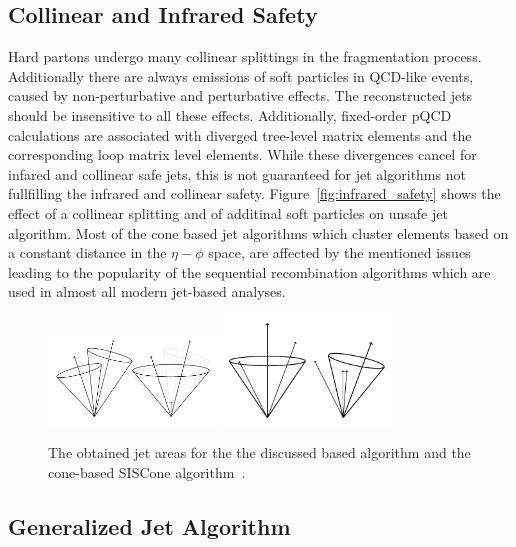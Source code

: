 \subsection{Collinear and Infrared Safety}
\label{section:coll_safety}

Hard partons undergo many collinear splittings in the fragmentation process.
Additionally there are always emissions of soft particles in QCD-like events,
caused by non-perturbative and perturbative effects. The reconstructed jets
should be insensitive to all these effects. Additionally, fixed-order pQCD
calculations are associated with diverged tree-level matrix elements and the
corresponding loop matrix level elements. While these divergences cancel for
infared and collinear safe jets, this is not guaranteed for jet algorithms not
fullfilling the infrared and collinear safety. Figure~\ref{fig:infrared_safety}
shows the effect of a collinear splitting and of additinal soft particles on
unsafe jet algorithm. Most of the cone based jet algorithms which cluster
elements based on a constant distance in the $\eta-\phi$ space, are affected by
the mentioned issues leading to the popularity of the sequential recombination
algorithms which are used in almost all modern jet-based analyses.

\begin{figure}[htb]
    \centering
    \includegraphics[width=0.4\textwidth]{figures/drawings/infrared_safety/jetinfrared.pdf}
    \includegraphics[width=0.4\textwidth]{figures/drawings/infrared_safety/jetcollinear.pdf}
    \caption{The obtained jet areas for the the discussed \kt based algorithm
        and the cone-based SISCone algorithm~\cite{Salam:2009jx}.}
    \label{fig:jet_shapes}
\end{figure}

\subsection{Generalized \kt Jet Algorithm}

